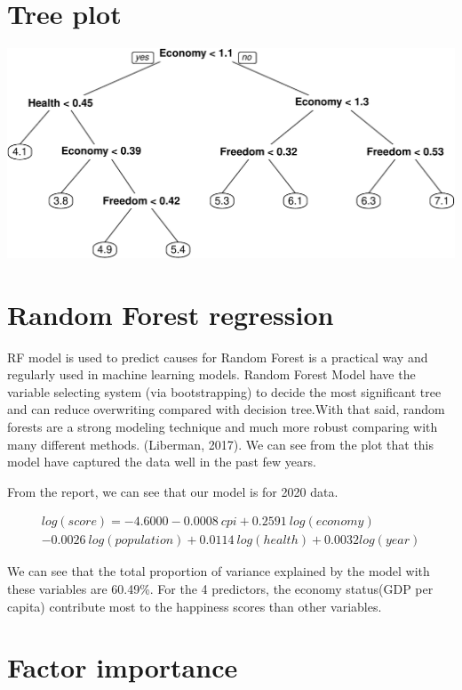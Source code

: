\documentclass[11pt,a4paper,]{article}
\begin{document}
\hypertarget{tree-plot}{%
\section{Tree plot}\label{tree-plot}}

\includegraphics{Assignment4_files/figure-latex/unnamed-chunk-7-1.pdf}

\hypertarget{random-forest-regression}{%
\section{Random Forest regression}\label{random-forest-regression}}

RF model is used to predict causes for Random Forest is a practical way and regularly used in machine learning models. Random Forest Model have the variable selecting system (via bootstrapping) to decide the most significant tree and can reduce overwriting compared with decision tree.With that said, random forests are a strong modeling technique and much more robust comparing with many different methods. (Liberman, 2017). We can see from the plot that this model have captured the data well in the past few years.

From the report, we can see that our model is for 2020 data.

\[
\begin{aligned}
log(score)= -4.6000-0.0008\ cpi+0.2591\ log(economy)\\-0.0026\ log(population)+0.0114\ log(health)+0.0032log(year)
\end{aligned}
\]

We can see that the total proportion of variance explained by the model with these variables are 60.49\%. For the 4 predictors, the economy status(GDP per capita) contribute most to the happiness scores than other variables.

\hypertarget{factor-importance}{%
\section{Factor importance}\label{factor-importance}}
\end{document}
